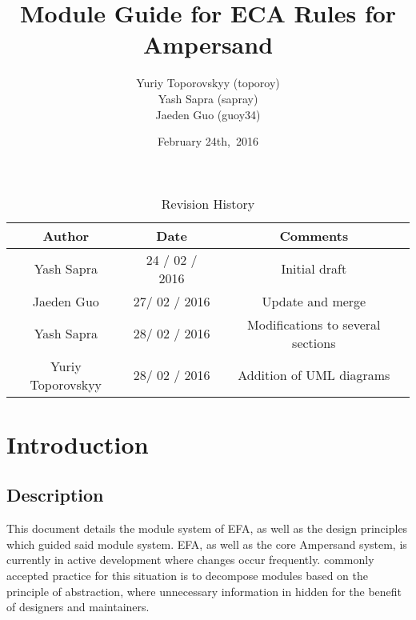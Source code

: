 \documentclass[12pt, svgnames]{article}
\let\Oldsubsection\subsection
\renewcommand{\subsection}{\FloatBarrier\Oldsubsection}
\begin{document}
\title{\vspace*{3cm} Module Guide for ECA Rules for Ampersand} 
\author{Yuriy Toporovskyy (toporoy)\\ Yash Sapra (sapray) \\ Jaeden Guo (guoy34)}
\date{February 24th,\ 2016} 


\maketitle
\newpage
\vspace*{1cm}
\begin{table}[ht!]\begin{center}
        \caption{Revision History}  
        \begin{tabular}{|c|c|c|}\hline
            \textbf{Author} & \textbf{Date} & \textbf{Comments} \\\hline 
            Yash Sapra & 24 / 02 / 2016 & Initial draft\\\hline
	 Jaeden Guo & 27/ 02 / 2016 & Update and merge \\\hline
	 Yash Sapra & 28/ 02 / 2016 & Modifications to several sections \\\hline
	 Yuriy Toporovskyy & 28/ 02 / 2016 & Addition of UML diagrams \\\hline
        \end{tabular}
    \end{center}\end{table}
\newpage

\tableofcontents

\newpage

\section{Introduction}
\subsection{Description}

This document details the module system of EFA, as well as the design principles
which guided said module system. EFA, as well as the core Ampersand system, is
currently in active development where changes occur frequently.  commonly
accepted practice for this situation is to decompose modules based on the
principle of abstraction, where unnecessary information in hidden for the
benefit of designers and maintainers\citep{modStruct,Parnas1972}.
\end{document}
